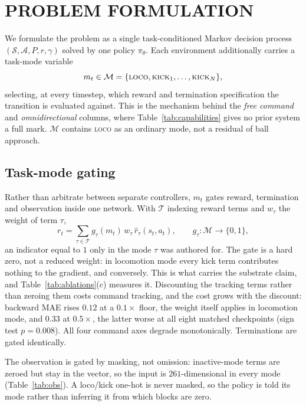 \documentclass[letterpaper, 10 pt, conference]{ieeeconf}  %
\begin{document}
\section{PROBLEM FORMULATION}

We formulate the problem as a single task-conditioned Markov decision process
$(\mathcal{S}, \mathcal{A}, P, r, \gamma)$ solved by one policy $\pi_\theta$.
Each environment additionally carries a task-mode variable
\begin{equation}
m_t \in \mathcal{M} = \{\textsc{loco}, \textsc{kick}_1, \dots, \textsc{kick}_N\},
\label{eq:taskmode}
\end{equation}
selecting, at every timestep, which reward and termination specification the
transition is evaluated against. This is the mechanism behind the \emph{free
command} and \emph{omnidirectional} columns, where
Table~\ref{tab:capabilities} gives no prior system a full mark. $\mathcal{M}$ contains \textsc{loco} as an
ordinary mode, not a residual of ball approach.

\subsection{Task-mode gating}
\label{sec:gating}

Rather than arbitrate between separate controllers, $m_t$ gates reward,
termination and observation inside one network. With $\mathcal{T}$ indexing
reward terms and $w_\tau$ the weight of term $\tau$,
\begin{equation}
r_t = \sum_{\tau \in \mathcal{T}} g_\tau(m_t)\, w_\tau\, \hat{r}_\tau(s_t, a_t),
\qquad
g_\tau : \mathcal{M} \to \{0, 1\},
\label{eq:gating}
\end{equation}
an indicator equal to $1$ only in the mode $\tau$ was authored for. The gate
is a hard zero, not a reduced weight: in locomotion mode every kick term
contributes nothing to the gradient, and conversely. This is what carries the
substrate claim, and Table~\ref{tab:ablations}(c) measures it. Discounting the
tracking terms rather than zeroing them costs command tracking, and the cost
grows with the discount: backward MAE rises $0.12$ at a $0.1\times$ floor,
the weight \cite{robonaldo} itself applies in locomotion mode, and $0.33$ at
$0.5\times$, the latter worse at all eight matched checkpoints (sign test
$p{=}0.008$). All four command axes degrade monotonically. Terminations are
gated identically.

The observation is gated by masking, not omission: inactive-mode terms are
zeroed but stay in the vector, so the input is $261$-dimensional in every mode
(Table~\ref{tab:obs}). A loco/kick one-hot is never masked, so the policy
is told its mode rather than inferring it from which blocks are zero.
\end{document}
